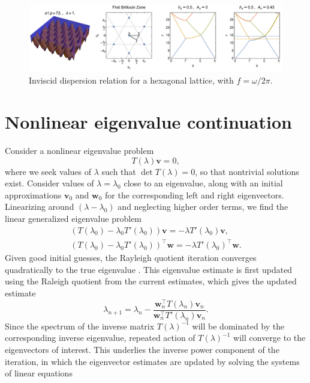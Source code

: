 \documentclass[aps,pre,amsmath,amssymb,floatfix,onecolumn,notitlepage,10pt]{revtex4-1}
\begin{document}
\begin{figure}[hbt]
\includegraphics[width=\columnwidth]{hexagonal}
\caption{Inviscid dispersion relation for a hexagonal lattice, with $f=\omega/2\pi$. \label{fig2}}
\end{figure}

\section{Nonlinear eigenvalue continuation}
Consider a nonlinear eigenvalue problem
\begin{equation}
T(\lambda) \mathbf{v} = 0,
\end{equation}
where we seek values of $\lambda$ such that $\det T(\lambda)=0$, so that nontrivial solutions exist. Consider values of $\lambda=\lambda_0$ close to an eigenvalue, along with an initial approximations $\mathbf{v}_0$ and $\mathbf{w}_0$ for the corresponding left and right eigenvectors. Linearizing around $(\lambda-\lambda_0)$ and neglecting higher order terms, we find the linear generalized eigenvalue problem
\begin{align}
(T(\lambda_0)-\lambda_0 T'(\lambda_0))\mathbf{v} = -\lambda T'(\lambda_0) \mathbf{v}, \\
(T(\lambda_0)-\lambda_0 T'(\lambda_0))^\intercal \mathbf{w} = -\lambda T'(\lambda_0)^\intercal \mathbf{w}.
\end{align}
Given good initial guesses, the Rayleigh quotient iteration converges quadratically to the true eigenvalue \cite{1973_Ruhe}. This eigenvalue estimate is first updated using the Raleigh quotient from the current estimates, which gives  the updated estimate 
\begin{equation}
\lambda_{n+1} = \lambda_n - \frac{\mathbf{w}_n^\intercal T(\lambda_n) \mathbf{v}_n}{\mathbf{w}_n^\intercal T'(\lambda_n) \mathbf{v}_n}. \label{rayleigh}
\end{equation}
Since the spectrum of the inverse matrix $T(\lambda)^{-1}$ will be dominated by the corresponding inverse eigenvalue, repeated action of $T(\lambda)^{-1}$ will converge to the eigenvectors of interest. This underlies the inverse power component of the iteration, in which the eigenvector estimates are updated by solving the systems of linear equations 
\end{document}
